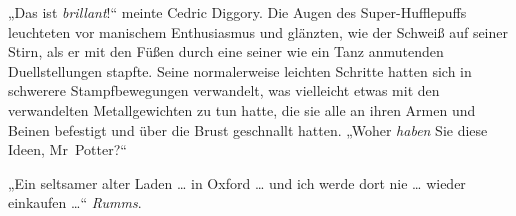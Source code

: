 „Das ist \emph{brillant}!“ meinte Cedric Diggory. Die Augen des Super-Hufflepuffs leuchteten vor manischem Enthusiasmus und glänzten, wie der Schweiß auf seiner Stirn, als er mit den Füßen durch eine seiner wie ein Tanz anmutenden Duellstellungen stapfte. Seine normalerweise leichten Schritte hatten sich in schwerere Stampfbewegungen verwandelt, was vielleicht etwas mit den verwandelten Metallgewichten zu tun hatte, die sie alle an ihren Armen und Beinen befestigt und über die Brust geschnallt hatten.
„Woher \emph{haben} Sie diese Ideen, Mr~Potter?“

„Ein seltsamer alter Laden … in Oxford … und ich werde dort nie … wieder einkaufen …“ \emph{Rumms}.

